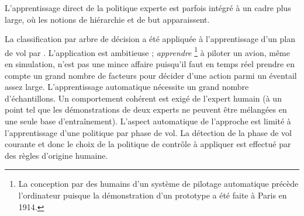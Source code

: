 \documentclass[frenchb,a4paper,justified,notoc]{tufte-book}
\begin{document}
L'apprentissage direct de la politique experte est parfois intégré à un cadre plus large, où les notions de hiérarchie et de but apparaissent.

La classification par arbre de décision a été appliquée à l'apprentissage d'un plan de vol par \citet{sammut1992learning}. L'application est ambitieuse ; \emph{apprendre} \footnote{La conception par des humains d'un système de pilotage automatique précède l'ordinateur puisque la démonstration d'un prototype a été faite à Paris en 1914.
 } à piloter un avion, même en simulation, n'est pas une mince affaire puisqu'il faut en temps réel prendre en compte un grand nombre de facteurs pour décider d'une action parmi un éventail assez large. L'apprentissage automatique nécessite un grand nombre d'échantillons. Un comportement cohérent est exigé de l'expert humain (à un point tel que les démonstrations de deux experts ne peuvent être mélangées en une seule base d'entraînement). L'aspect automatique de l'approche est limité à l'apprentissage d'une politique par phase de vol. La détection de la phase de vol courante et donc le choix de la politique de contrôle à appliquer est effectué par des règles d'origine humaine.
\end{document}
